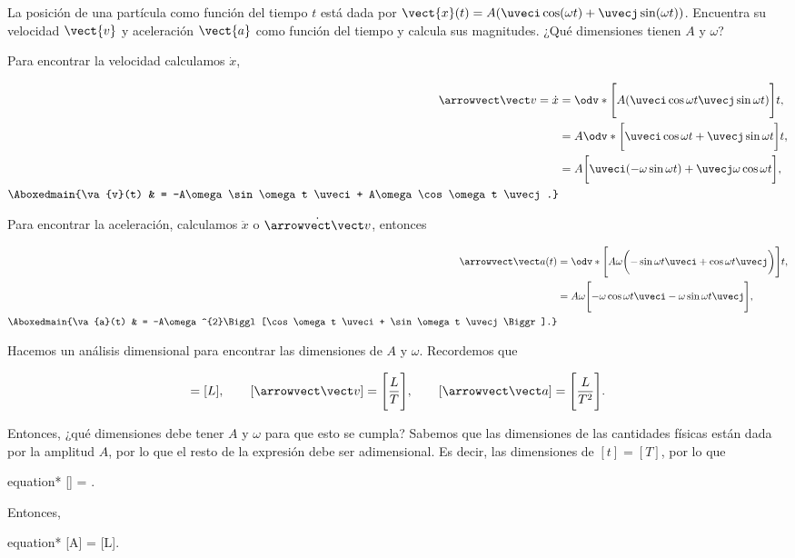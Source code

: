 \documentclass[../main.tex]{subfiles}
\begin{document}
\begin{problema}
	La posición de una partícula como función del tiempo \(t\) está dada
	por \(\vect{x}(t) = A(\uveci\cos(\omega t) + \uvecj\sin(\omega t))\).
	Encuentra su velocidad \(\vect{v}\) y aceleración \(\vect{a}\)
	como función del tiempo y calcula sus magnitudes.
	¿Qué dimensiones tienen \(A\) y \(\omega\)?

	\startsolution

	Para encontrar la velocidad calculamos \(\dot{x}\),

	\begin{align}
		\va{v} = \dot{x}      & = \odv*{\Biggl[A(\uveci\cos\omega t \uvecj\sin\omega t)\Biggr]}{t},\nonumber       \\
		                      & = A\odv*{\biggl[\uveci\cos\omega t + \uvecj\sin\omega t\biggr]}{t},\nonumber       \\
		                      & = A \biggl[\uveci(-\omega\sin\omega t) + \uvecj\omega\cos\omega t\biggr],\nonumber \\
		\Aboxedmain{\va{v}(t) & = -A\omega\sin\omega t \uveci + A\omega\cos\omega t \uvecj.}\label{eq:Velocity}
	\end{align}


	Para encontrar la aceleración, calculamos \(\ddot{x}\) o \(\dot{\va{v}}\), entonces

	\begin{align*}
		\va{a}(t)             & = \odv*{\Biggl[A\omega \biggl(-\sin\omega t \uveci + \cos\omega t \uvecj\biggr)\Biggr]}{t},\nonumber \\
		                      & = A\omega \Biggl[-\omega\cos\omega t \uveci - \omega\sin\omega t \uvecj\Biggr],\nonumber             \\
		\Aboxedmain{\va{a}(t) & = -A\omega^{2}\Biggl[\cos\omega t \uveci + \sin\omega t \uvecj\Biggr].}
	\end{align*}

	Hacemos un análisis dimensional para encontrar las dimensiones de \(A\) y \(\omega\).
	Recordemos que

	\begin{equation*}
		[\va{x}] = [L],\qquad [\va{v}] = \Biggl[\dfrac{L}{T}\Biggr],\qquad [\va{a}] = \Biggl[\dfrac{L}{T^{2}}\Biggr].
	\end{equation*}

	Entonces, ¿qué dimensiones debe tener \(A\) y \(\omega\) para que esto se cumpla?
	Sabemos que las dimensiones de las cantidades físicas están dada por la amplitud
	\(A\), por lo que el resto de la expresión debe ser adimensional. Es decir, las
	dimensiones de \([t] = [T]\), por lo que

	\begin{empheq}[box=\mainresult]{equation*}
		[\omega] = .
	\end{empheq}

	Entonces,

	\begin{empheq}[box=\mainresult]{equation*}
		[A] = [L].
	\end{empheq}
\end{problema}
\end{document}
